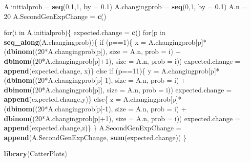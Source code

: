\documentclass[]{article}
\newenvironment{Shaded}{\begin{snugshade}}{\end{snugshade}}
\newcommand{\KeywordTok}[1]{\textcolor[rgb]{0.13,0.29,0.53}{\textbf{{#1}}}}
\newcommand{\DataTypeTok}[1]{\textcolor[rgb]{0.13,0.29,0.53}{{#1}}}
\newcommand{\DecValTok}[1]{\textcolor[rgb]{0.00,0.00,0.81}{{#1}}}
\newcommand{\FloatTok}[1]{\textcolor[rgb]{0.00,0.00,0.81}{{#1}}}
\newcommand{\StringTok}[1]{\textcolor[rgb]{0.31,0.60,0.02}{{#1}}}
\newcommand{\NormalTok}[1]{{#1}}
\begin{document}
\begin{Shaded}
\begin{Highlighting}[]
\NormalTok{A.initialprob =}\StringTok{ }\KeywordTok{seq}\NormalTok{(}\FloatTok{0.1}\NormalTok{,}\DecValTok{1}\NormalTok{, }\DataTypeTok{by =} \FloatTok{0.1}\NormalTok{)}
\NormalTok{A.changingprob =}\StringTok{ }\KeywordTok{seq}\NormalTok{(}\DecValTok{0}\NormalTok{,}\DecValTok{1}\NormalTok{, }\DataTypeTok{by =} \FloatTok{0.1}\NormalTok{)}
\NormalTok{A.n =}\StringTok{ }\DecValTok{20}
\NormalTok{A.SecondGenExpChange =}\StringTok{ }\KeywordTok{c}\NormalTok{()}

\NormalTok{for(i in A.initialprob)\{}
  \NormalTok{expected.change =}\StringTok{ }\KeywordTok{c}\NormalTok{()}
  \NormalTok{for(p in }\KeywordTok{seq_along}\NormalTok{(A.changingprob))\{}
    \NormalTok{if (p==}\DecValTok{1}\NormalTok{)\{}
      \NormalTok{x =}\StringTok{ }\NormalTok{A.changingprob[p]*(}\KeywordTok{dbinom}\NormalTok{((}\DecValTok{20}\NormalTok{*A.changingprob[p]), }\DataTypeTok{size =} \NormalTok{A.n, }\DataTypeTok{prob =} \NormalTok{i) +}\StringTok{ }\KeywordTok{dbinom}\NormalTok{((}\DecValTok{20}\NormalTok{*A.changingprob[p]+}\DecValTok{1}\NormalTok{), }\DataTypeTok{size =} \NormalTok{A.n, }\DataTypeTok{prob =} \NormalTok{i))}
      \NormalTok{expected.change =}\StringTok{ }\KeywordTok{append}\NormalTok{(expected.change, x)\}}
    \NormalTok{else if (p==}\DecValTok{11}\NormalTok{)\{}
      \NormalTok{y =}\StringTok{ }\NormalTok{A.changingprob[p]*(}\KeywordTok{dbinom}\NormalTok{((}\DecValTok{20}\NormalTok{*A.changingprob[p]-}\DecValTok{1}\NormalTok{), }\DataTypeTok{size =} \NormalTok{A.n, }\DataTypeTok{prob =} \NormalTok{i) +}\StringTok{ }\KeywordTok{dbinom}\NormalTok{((}\DecValTok{20}\NormalTok{*A.changingprob[p]), }\DataTypeTok{size =} \NormalTok{A.n, }\DataTypeTok{prob =} \NormalTok{i))}
      \NormalTok{expected.change =}\StringTok{ }\KeywordTok{append}\NormalTok{(expected.change,y)\}}
    \NormalTok{else\{}
      \NormalTok{z =}\StringTok{ }\NormalTok{A.changingprob[p]*(}\KeywordTok{dbinom}\NormalTok{((}\DecValTok{20}\NormalTok{*A.changingprob[p]-}\DecValTok{1}\NormalTok{), }\DataTypeTok{size =} \NormalTok{A.n, }\DataTypeTok{prob =} \NormalTok{i) +}\StringTok{ }\KeywordTok{dbinom}\NormalTok{((}\DecValTok{20}\NormalTok{*A.changingprob[p]+}\DecValTok{1}\NormalTok{), }\DataTypeTok{size =} \NormalTok{A.n, }\DataTypeTok{prob =} \NormalTok{i))  }
      \NormalTok{expected.change =}\StringTok{ }\KeywordTok{append}\NormalTok{(expected.change,z)\}}
  \NormalTok{\}}
  \NormalTok{A.SecondGenExpChange =}\StringTok{ }\KeywordTok{append}\NormalTok{(A.SecondGenExpChange, }\KeywordTok{sum}\NormalTok{(expected.change))}
\NormalTok{\}}

\KeywordTok{library}\NormalTok{(CatterPlots)}
\end{Highlighting}
\end{Shaded}
\end{document}
